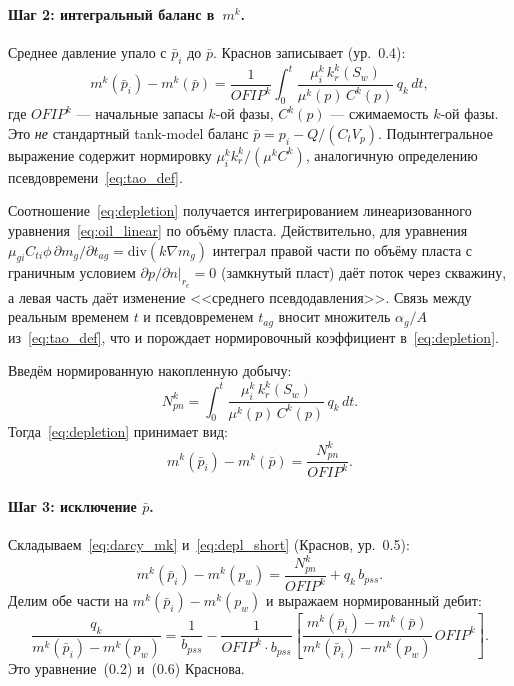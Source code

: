 ﻿\documentclass[12pt,a4paper]{article}
\begin{document}
\paragraph{Шаг 2: интегральный баланс в~$m^k$.}
Среднее давление упало с $\bar{p}_i$ до $\bar{p}$.
Краснов записывает (ур.~0.4):
\begin{equation}\label{eq:depletion}
  m^k(\bar{p}_i) - m^k(\bar{p})
  = \frac{1}{OFIP^k}\int_0^t
  \frac{\mu_i^k\,k_r^k(S_w)}
  {\mu^k(p)\,C^k(p)}\,q_k\,dt,
\end{equation}
где $OFIP^k$ --- начальные запасы $k$-ой фазы,
$C^k(p)$ --- сжимаемость $k$-ой фазы.
Это \emph{не} стандартный tank-model баланс
$\bar{p} = p_i - Q/(C_t V_p)$. Подынтегральное выражение
содержит нормировку $\mu_i^k k_r^k/(\mu^k C^k)$,
аналогичную определению псевдовремени~\eqref{eq:tao_def}.

Соотношение~\eqref{eq:depletion} получается
интегрированием линеаризованного
уравнения~\eqref{eq:oil_linear} по объёму пласта.
Действительно, для уравнения
$\mu_{gi} C_{ti} \phi\,\partial m_g/\partial t_{ag}
= \mathrm{div}(k\nabla m_g)$
интеграл правой части по объёму пласта с граничным
условием $\partial p/\partial n|_{r_e} = 0$
(замкнутый пласт) даёт поток через скважину, а
левая часть даёт изменение <<среднего псевдодавления>>.
Связь между реальным временем $t$ и псевдовременем
$t_{ag}$ вносит множитель $\alpha_g/A$
из~\eqref{eq:tao_def}, что и порождает нормировочный
коэффициент в~\eqref{eq:depletion}.

Введём нормированную накопленную добычу:
\begin{equation}\label{eq:Npn}
  N_{pn}^k = \int_0^t
  \frac{\mu_i^k\,k_r^k(S_w)}
  {\mu^k(p)\,C^k(p)}\,q_k\,dt.
\end{equation}
Тогда~\eqref{eq:depletion} принимает вид:
\begin{equation}\label{eq:depl_short}
  m^k(\bar{p}_i) - m^k(\bar{p}) = \frac{N_{pn}^k}{OFIP^k}.
\end{equation}

\paragraph{Шаг 3: исключение $\bar{p}$.}
Складываем~\eqref{eq:darcy_mk} и~\eqref{eq:depl_short}
(Краснов, ур.~0.5):
\begin{equation}\label{eq:fmb_step2}
  m^k(\bar{p}_i) - m^k(p_w)
  = \frac{N_{pn}^k}{OFIP^k} + q_k\,b_{pss}.
\end{equation}
Делим обе части на $m^k(\bar{p}_i) - m^k(p_w)$
и выражаем нормированный дебит:
\begin{equation}\label{eq:fmb}
  \boxed{
  \frac{q_k}{m^k(\bar{p}_i) - m^k(p_w)}
  = \frac{1}{b_{pss}}
  - \frac{1}{OFIP^k \cdot b_{pss}}
  \left[\frac{m^k(\bar{p}_i) - m^k(\bar{p})}
  {m^k(\bar{p}_i) - m^k(p_w)}\,OFIP^k\right].}
\end{equation}
Это уравнение~(0.2) и~(0.6) Краснова.
\end{document}
